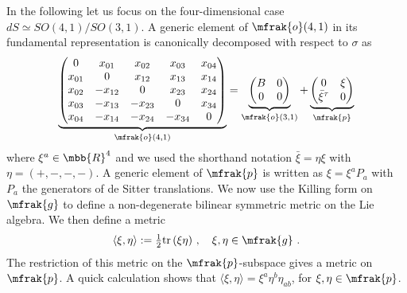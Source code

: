 \documentclass[11pt]{article}
\begin{document}
In the following let us focus on the four-dimensional case $dS 
\simeq SO(4,1)/SO(3,1)$. A generic element of $\mfrak{o}(4,1)$ in 
its fundamental representation is canonically decomposed with 
respect to $\sigma$ as
\begin{displaymath}
	\underbrace{\begin{pmatrix}
		0				& x_{01}	& x_{02}	& x_{03}	& x_{04} \\
		x_{01}	& 0				& x_{12}	& x_{13}	& x_{14} \\
		x_{02}	&	-x_{12}	& 0				& x_{23}	& x_{24} \\
		x_{03}	&	-x_{13}	& -x_{23}	& 0				& x_{34} \\
		x_{04}	&	-x_{14}	& -x_{24}	& -x_{34}	& 0	
	\end{pmatrix}}_{\mfrak{o}(4,1)}
	=
	\underbrace{\begin{pmatrix}
		B & 0 \\
		0 & 0
	\end{pmatrix}}_{\mfrak{o}(3,1)}
	+
	\underbrace{\begin{pmatrix}
		0								& \xi \\
		\bar{\xi}^\tau	& 0
	\end{pmatrix}}_{\mfrak{p}}
\end{displaymath}
where $\xi^a \in \mbb{R}^{4}$ and we used the shorthand notation 
$\bar{\xi} = \eta\xi$ with $\eta = (+,-,-,-)$. A generic element 
of $\mfrak{p}$ is written as $\xi = \xi^a P_a$ with $P_a$ the 
generators of de Sitter translations. We now use the Killing form 
on $\mfrak{g}$ to define a non-degenerate bilinear symmetric 
metric on the Lie algebra. We then define a metric
%
\begin{equation}
	\langle \xi,\eta \rangle := \tfrac{1}{2} \mathrm{tr}\, 
	(\xi\eta)~,\quad \xi,\eta \in \mfrak{g}~.
\end{equation}
The restriction of this metric on the $\mfrak{p}$-subspace gives 
a metric on $\mfrak{p}$. A quick calculation shows that $\langle 
\xi,\eta \rangle = \xi^a \eta^b \eta_{ab}$, for $\xi,\eta \in 
\mfrak{p}$.
\end{document}
